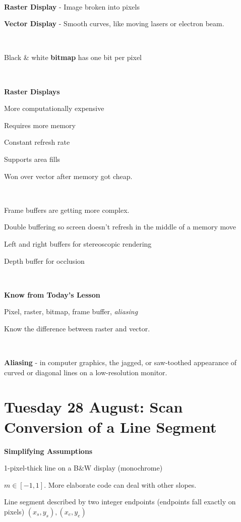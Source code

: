\documentclass[12pt]{article}
\begin{document}
\begin{spacing}{1.2}
\

{\bf Raster Display} - Image broken into pixels

{\bf Vector Display} - Smooth curves, like moving lasers or electron beam.  

\

Black \& white {\bf bitmap} has one bit per pixel

\

{\bf Raster Displays}

More computationally expensive

Requires more memory

Constant refresh rate

Supports area fills

Won over vector after memory got cheap.  

\

Frame buffers are getting more complex.  

\qquad Double buffering so screen doesn't refresh in the middle of a memory move

\qquad Left and right buffers for stereoscopic rendering

\qquad Depth buffer for occlusion

\

{\bf Know from Today's Lesson}

Pixel, raster, bitmap, frame buffer, {\it aliasing}

Know the difference between raster and vector.  

\

{\bf Aliasing} - in computer graphics, the jagged, or saw-toothed appearance of curved or diagonal lines on a low-resolution monitor.

\section{Tuesday 28 August:  Scan Conversion of a Line Segment}

{\bf Simplifying Assumptions}

1-pixel-thick line on a B\&W display (monochrome)

$m \in [-1,1]$.  More elaborate code can deal with other slopes.

Line segment described by two integer endpoints (endpoints fall exactly on pixels) $(x_s,y_s), (x_e,y_e)$

\

\hfil{}


\end{spacing}
\end{document}

